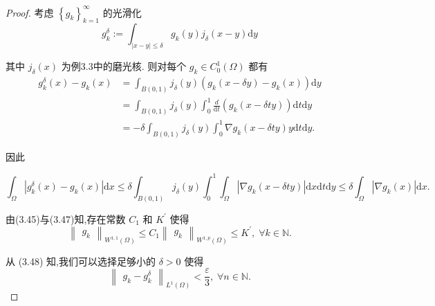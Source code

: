 \documentclass[lang=cn,newtx,10pt,scheme=chinese,thmcnt=chapter]{elegantbook}
\newcommand{\dif}{\mathrm{d}}
\begin{document}
\begin{proof}
考虑 \({\left\{  {g}_{k}\right\}  }_{k = 1}^{\infty }\) 的光滑化
\begin{equation*}
{g}_{k}^{\delta } \mathrel{\text{ := }} {\int }_{\left| {x - y}\right|  \leqslant  \delta }{g}_{k}\left( y\right) {j}_{\delta }\left( {x - y}\right) {\dif y}
\end{equation*}

其中 \({j}_{\delta }\left( x\right)\) 为例3.3中的磨光核. 则对每个 \({g}_{k} \in  {C}_{0}^{1}\left( \Omega \right)\) 都有
\begin{equation*}
\begin{aligned}
    {g}_{k}^{\delta }\left( x\right)  - {g}_{k}\left( x\right)  &= {\int }_{B\left( {0,1}\right) }{j}_{\delta }\left( y\right) \left( {{g}_{k}\left( {x - {\delta y}}\right)  - {g}_{k}\left( x\right) }\right) {\dif y}\\
&= {\int }_{B\left( {0,1}\right) }{j}_{\delta }\left( y\right) {\int }_{0}^{1}\frac{d}{\dif t}\left( {{g}_{k}\left( {x - {\delta ty}}\right) }\right) {\dif t\dif y}\\&
=  - \delta {\int }_{B\left( {0,1}\right) }{j}_{\delta }\left( y\right) {\int }_{0}^{1}\nabla {g}_{k}\left( {x - {\delta ty}}\right) {y\dif t\dif y}.
\end{aligned}
\end{equation*}

因此

\begin{equation}
{\int }_{\Omega }\left| {{g}_{k}^{\delta }\left( x\right)  - {g}_{k}\left( x\right) }\right| {\dif x} \leqslant  \delta {\int }_{B\left( {0,1}\right) }{j}_{\delta }\left( y\right) {\int }_{0}^{1}{\int }_{\Omega }\left| {\nabla {g}_{k}\left( {x - {\delta ty}}\right) }\right| {\dif x\dif t\dif y}
\leqslant  \delta {\int }_{\Omega }\left| {\nabla {g}_{k}\left( x\right) }\right| {\dif x}. \label{3.48}
\end{equation}

由(3.45)与(3.47)知,存在常数 \({C}_{1}\) 和 \({K}^{\prime }\) 使得
\begin{equation*}
{\begin{Vmatrix}{g}_{k}\end{Vmatrix}}_{{W}^{1,1}\left( \Omega \right) } \leqslant  {C}_{1}{\begin{Vmatrix}{g}_{k}\end{Vmatrix}}_{{W}^{1,p}\left( \Omega \right) } \leqslant  {K}^{\prime },\;\forall k \in  \mathbb{N}.
\end{equation*}

从 (3.48) 知,我们可以选择足够小的 \(\delta  > 0\) 使得
\begin{equation}
{\begin{Vmatrix}{g}_{k} - {g}_{k}^{\delta }\end{Vmatrix}}_{{L}^{1}\left( \Omega \right) } < \frac{\varepsilon }{3},\;\forall n \in  \mathbb{N}. \label{3.49}
\end{equation}


\end{proof}
\end{document}
